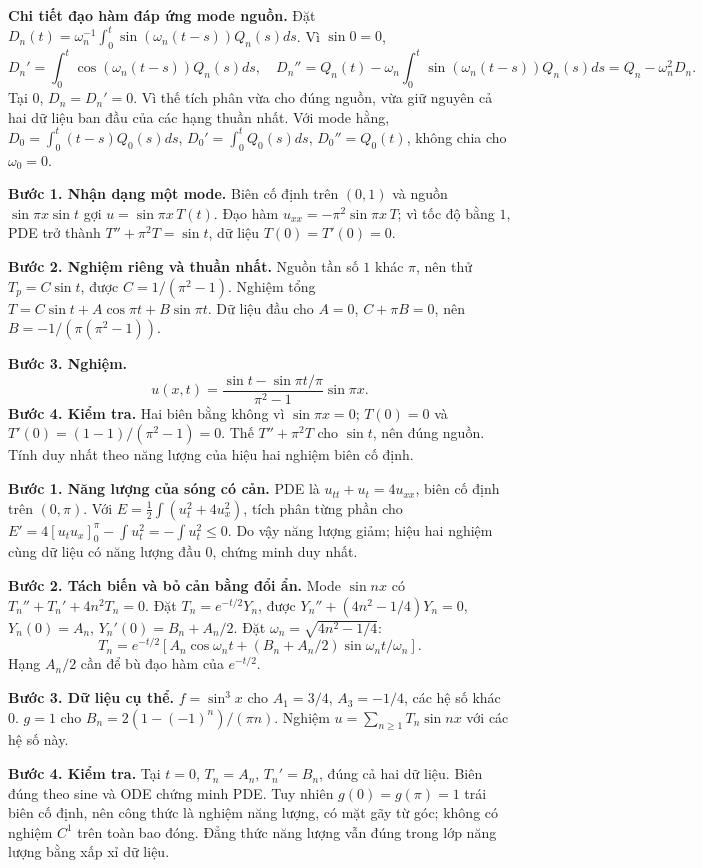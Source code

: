 \textbf{Chi tiết đạo hàm đáp ứng mode nguồn.} Đặt $D_n(t)=\omega_n^{-1}\int_0^t\sin(\omega_n(t-s))Q_n(s)ds$. Vì $\sin0=0$,
\[D_n'=\int_0^t\cos(\omega_n(t-s))Q_n(s)ds,\quad
D_n''=Q_n(t)-\omega_n\int_0^t\sin(\omega_n(t-s))Q_n(s)ds=Q_n-\omega_n^2D_n.\]
Tại $0$, $D_n=D_n'=0$. Vì thế tích phân vừa cho đúng nguồn, vừa giữ nguyên cả hai dữ liệu ban đầu của các hạng thuần nhất. Với mode hằng, $D_0=\int_0^t(t-s)Q_0(s)ds$, $D_0'=\int_0^tQ_0(s)ds$, $D_0''=Q_0(t)$, không chia cho $\omega_0=0$.

\textbf{Bước 1. Nhận dạng một mode.} Biên cố định trên $(0,1)$ và nguồn $\sin\pi x\sin t$ gợi $u=\sin\pi x\,T(t)$. Đạo hàm $u_{xx}=-\pi^2\sin\pi x\,T$; vì tốc độ bằng $1$, PDE trở thành $T''+\pi^2T=\sin t$, dữ liệu $T(0)=T'(0)=0$.

\textbf{Bước 2. Nghiệm riêng và thuần nhất.} Nguồn tần số $1$ khác $\pi$, nên thử $T_p=C\sin t$, được $C=1/(\pi^2-1)$. Nghiệm tổng $T=C\sin t+A\cos\pi t+B\sin\pi t$. Dữ liệu đầu cho $A=0$, $C+\pi B=0$, nên $B=-1/(\pi(\pi^2-1))$.

\textbf{Bước 3. Nghiệm.}
\[u(x,t)=\frac{\sin t-\sin\pi t/\pi}{\pi^2-1}\sin\pi x.\]
\textbf{Bước 4. Kiểm tra.} Hai biên bằng không vì $\sin\pi x=0$; $T(0)=0$ và $T'(0)=(1-1)/(\pi^2-1)=0$. Thế $T''+\pi^2T$ cho $\sin t$, nên đúng nguồn. Tính duy nhất theo năng lượng của hiệu hai nghiệm biên cố định.

\textbf{Bước 1. Năng lượng của sóng có cản.} PDE là $u_{tt}+u_t=4u_{xx}$, biên cố định trên $(0,\pi)$. Với $E=\frac12\int(u_t^2+4u_x^2)$, tích phân từng phần cho $E'=4[u_tu_x]_0^\pi-\int u_t^2=-\int u_t^2\le0$. Do vậy năng lượng giảm; hiệu hai nghiệm cùng dữ liệu có năng lượng đầu $0$, chứng minh duy nhất.

\textbf{Bước 2. Tách biến và bỏ cản bằng đổi ẩn.} Mode $\sin nx$ có $T_n''+T_n'+4n^2T_n=0$. Đặt $T_n=e^{-t/2}Y_n$, được $Y_n''+(4n^2-1/4)Y_n=0$, $Y_n(0)=A_n$, $Y_n'(0)=B_n+A_n/2$. Đặt $\omega_n=\sqrt{4n^2-1/4}$:
\[T_n=e^{-t/2}[A_n\cos\omega_nt+(B_n+A_n/2)\sin\omega_nt/\omega_n].\]
Hạng $A_n/2$ cần để bù đạo hàm của $e^{-t/2}$.

\textbf{Bước 3. Dữ liệu cụ thể.} $f=\sin^3x$ cho $A_1=3/4$, $A_3=-1/4$, các hệ số khác $0$. $g=1$ cho $B_n=2(1-(-1)^n)/(\pi n)$. Nghiệm $u=\sum_{n\ge1}T_n\sin nx$ với các hệ số này.

\textbf{Bước 4. Kiểm tra.} Tại $t=0$, $T_n=A_n$, $T_n'=B_n$, đúng cả hai dữ liệu. Biên đúng theo sine và ODE chứng minh PDE. Tuy nhiên $g(0)=g(\pi)=1$ trái biên cố định, nên công thức là nghiệm năng lượng, có mặt gãy từ góc; không có nghiệm $C^1$ trên toàn bao đóng. Đẳng thức năng lượng vẫn đúng trong lớp năng lượng bằng xấp xỉ dữ liệu.

